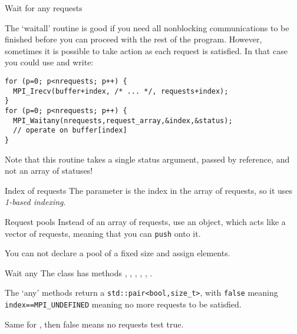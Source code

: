  {Wait for any requests}

The `waitall' routine is good if you need all nonblocking
communications to be finished before you can proceed with the rest of
the program. However, sometimes it is possible to take action as each
request is satisfied. In that case you could use
 and write:

\begin{lstlisting}
for (p=0; p<nrequests; p++) {
  MPI_Irecv(buffer+index, /* ... */, requests+index);
}
for (p=0; p<nrequests; p++) {
  MPI_Waitany(nrequests,request_array,&index,&status);
  // operate on buffer[index]
}
\end{lstlisting}

Note that this routine takes a single status argument, passed by
reference, and not an array of statuses!

\begin{fortrannote}{Index of requests}
  The  parameter is the index in the array of requests,
  so it uses \emph{1-based indexing}.

\end{fortrannote}

\begin{mplnote}{Request pools}
  \label{mpl:req_pool}
  Instead of an array of requests,
  use an  object,
  which acts like a vector of requests,
  meaning that you can \lstinline+push+ onto it.


  You can not declare a pool of a fixed size and assign elements.
\end{mplnote}

\begin{mplnote}{Wait any}
  \label{mpl:wait_any}
  The  class has methods
  , ,
  , ,
  , .

  The `any' methods return a \lstinline+std::pair<bool,size_t>+,
  with \lstinline{false} meaning \lstinline+index==MPI_UNDEFINED+
  meaning no more requests to be satisfied.

  Same for , then false means no requests test true.
\end{mplnote}

